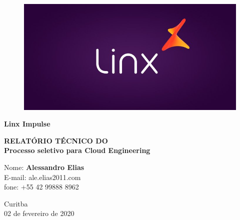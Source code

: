 \begin{titlepage}

  \begin{figure}[!ht]
    \filcenter
    \includegraphics[height=0.33\textheight, width=0.33\linewidth, keepaspectratio]{imagens/LINX-LOGO.jpg}
  \end{figure}
  \vspace{-2.5em}
  \begin{Large}
      \begin{center}
        \textbf{Linx Impulse}
  
        \vfill
  
        \textbf{RELATÓRIO TÉCNICO DO\\
        Processo seletivo para Cloud Engineering
      }
    \end{center}

    \vfill

    Nome: \textbf{Alessandro Elias}\\
    E-mail: ale.elias2011\@gmail.com\\
    fone: +55 42 99888 8962

    \vfill
    
    \begin{center}
      Curitba\\
      02 de fevereiro de 2020
    \end{center}
  \end{Large}

  \clearpage
\end{titlepage}